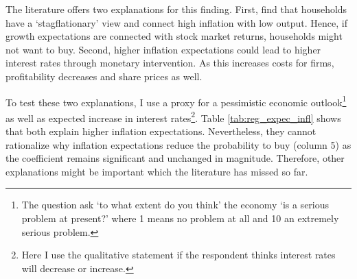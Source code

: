 \documentclass[ProjectABM]{subfiles}
\begin{document}








The literature offers two explanations for this finding. First, \cite{CCG_2020_inflation_communication} find that households have a `stagflationary' view and connect high inflation with low output. Hence, if growth expectations are connected with stock market returns, households might not want to buy. Second, higher inflation expectations could lead to higher interest rates through monetary intervention. As this increases costs for firms, profitability decreases and share prices as well. 

To test these two explanations, I use a proxy for a pessimistic economic outlook\footnote{The question ask `to what extent do you think' the economy `is a serious problem at present?' where 1 means no problem at all and 10 an extremely serious problem.} as well as expected increase in interest rates\footnote{Here I use the qualitative statement if the respondent thinks interest rates will decrease or increase.}. Table \ref{tab:reg_expec_infl} shows that both explain higher inflation expectations. Nevertheless, they cannot rationalize why inflation expectations reduce the probability to buy (column 5) as the coefficient remains significant and unchanged in magnitude. Therefore, other explanations might be important which the literature has missed so far.

\end{document}
